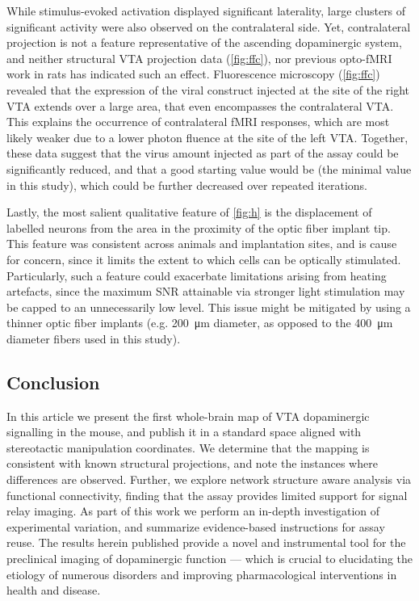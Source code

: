 While stimulus-evoked activation displayed significant laterality, large clusters of significant activity were also observed on the contralateral side.
Yet, contralateral projection is not a feature representative of the ascending dopaminergic system, and neither structural VTA projection data (\cref{fig:ffc}), nor previous opto-fMRI work in rats \cite{Lohani2016} has indicated such an effect.
Fluorescence microscopy (\cref{fig:ffc}) revealed that the expression of the viral construct injected at the site of the right VTA extends over a large area, that even encompasses the contralateral VTA.
This explains the occurrence of contralateral fMRI responses, which are most likely weaker due to a lower photon fluence at the site of the left VTA.
Together, these data suggest that the virus amount injected as part of the assay could be significantly reduced, and that a good starting value would be
 (the minimal value in this study),
which could be further decreased over repeated iterations.

Lastly, the most salient qualitative feature of \cref{fig:h} is the displacement of labelled neurons from the area in the proximity of the optic fiber implant tip.
This feature was consistent across animals and implantation sites, and is cause for concern, since it limits the extent to which cells can be optically stimulated.
Particularly, such a feature could exacerbate limitations arising from heating artefacts, since the maximum SNR attainable via stronger light stimulation may be capped to an unnecessarily low level.
This issue might be mitigated by using a thinner optic fiber implants (e.g. \SI{200}{\micro\meter} diameter, as opposed to the \SI{400}{\micro\meter} diameter fibers used in this study).

\subsection{Conclusion}

In this article we present the first whole-brain map of VTA dopaminergic signalling in the mouse, and publish it in a standard space aligned with stereotactic manipulation coordinates.
We determine that the mapping is consistent with known structural projections, and note the instances where differences are observed.
Further, we explore network structure aware analysis via functional connectivity, finding that the assay provides limited support for signal relay imaging.
As part of this work we perform an in-depth investigation of experimental variation, and summarize evidence-based instructions for assay reuse.
The results herein published provide a novel and instrumental tool for the preclinical imaging of dopaminergic function --- which is crucial to elucidating the etiology of numerous disorders and improving pharmacological interventions in health and disease.

